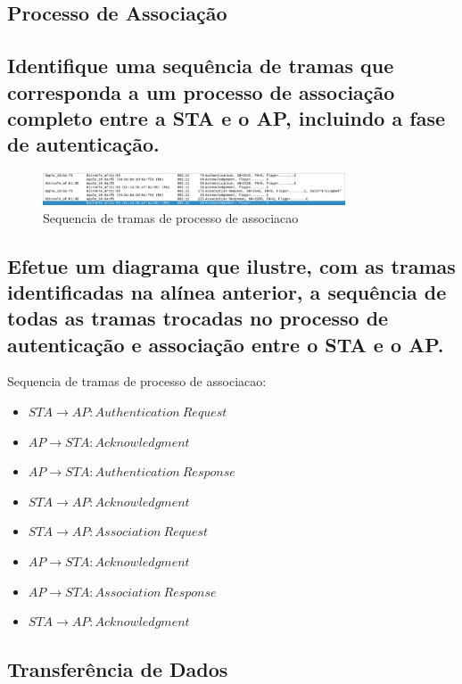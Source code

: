 \documentclass{article}
\begin{document}
\subsection*{Processo de Associação}

\subsection{Identifique uma sequência de tramas que corresponda a um processo de
associação completo entre a STA e o AP, incluindo a fase de autenticação.}

\begin{figure}[h]
    \centering
    \includegraphics[width=0.8\textwidth]{images/association.png}
    \caption{\label{fig:association}Sequencia de tramas de processo de associacao}
\end{figure}

\subsection{Efetue um diagrama que ilustre, com as tramas identificadas na alínea anterior, a
sequência de todas as tramas trocadas no processo de autenticação e associação
entre o STA e o AP.}

Sequencia de tramas de processo de associacao:
\begin{itemize}
    \item \(STA \rightarrow AP: Authentication\ Request\)
    \item \(AP \rightarrow STA: Acknowledgment\)
    \item \(AP \rightarrow STA: Authentication\ Response\)
    \item \(STA \rightarrow AP: Acknowledgment\)
    \item \(STA \rightarrow AP: Association\ Request\)
    \item \(AP \rightarrow STA: Acknowledgment\)
    \item \(AP \rightarrow STA: Association\ Response\)
    \item \(STA \rightarrow AP: Acknowledgment\)
\end{itemize}

\subsection*{Transferência de Dados}
\end{document}
